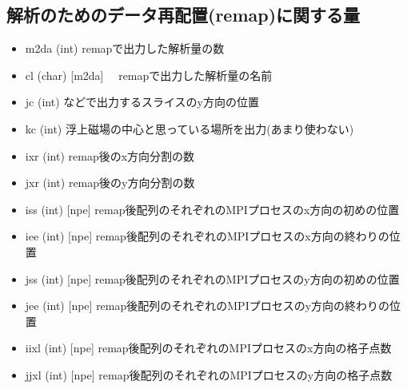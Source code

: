 \documentclass[letterpaper,10pt,dvipdfmx,report]{sphinxmanual}
\begin{document}
\subsection{解析のためのデータ再配置(remap)に関する量}
\label{\detokenize{notation:remap}}\begin{itemize}
\item {} 
\sphinxAtStartPar
m2da (int) \sphinxhyphen{}\sphinxhyphen{} remapで出力した解析量の数

\item {} 
\sphinxAtStartPar
cl (char) {[}m2da{]} \sphinxhyphen{}\sphinxhyphen{}　remapで出力した解析量の名前

\item {} 
\sphinxAtStartPar
jc (int) \sphinxhyphen{}\sphinxhyphen{}  などで出力するスライスのy方向の位置

\item {} 
\sphinxAtStartPar
kc (int) \sphinxhyphen{}\sphinxhyphen{} 浮上磁場の中心と思っている場所を出力(あまり使わない)

\item {} 
\sphinxAtStartPar
ixr (int) \sphinxhyphen{}\sphinxhyphen{} remap後のx方向分割の数

\item {} 
\sphinxAtStartPar
jxr (int) \sphinxhyphen{}\sphinxhyphen{} remap後のy方向分割の数

\item {} 
\sphinxAtStartPar
iss (int) {[}npe{]} \sphinxhyphen{}\sphinxhyphen{} remap後配列のそれぞれのMPIプロセスのx方向の初めの位置

\item {} 
\sphinxAtStartPar
iee (int) {[}npe{]} \sphinxhyphen{}\sphinxhyphen{} remap後配列のそれぞれのMPIプロセスのx方向の終わりの位置

\item {} 
\sphinxAtStartPar
jss (int) {[}npe{]} \sphinxhyphen{}\sphinxhyphen{} remap後配列のそれぞれのMPIプロセスのy方向の初めの位置

\item {} 
\sphinxAtStartPar
jee (int) {[}npe{]} \sphinxhyphen{}\sphinxhyphen{} remap後配列のそれぞれのMPIプロセスのy方向の終わりの位置

\item {} 
\sphinxAtStartPar
iixl (int) {[}npe{]} \sphinxhyphen{}\sphinxhyphen{} remap後配列のそれぞれのMPIプロセスのx方向の格子点数

\item {} 
\sphinxAtStartPar
jjxl (int) {[}npe{]} \sphinxhyphen{}\sphinxhyphen{} remap後配列のそれぞれのMPIプロセスのy方向の格子点数


\end{itemize}
\end{document}
